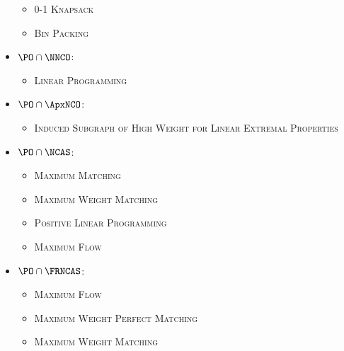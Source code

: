\documentclass{article}
\begin{document}
\begin{itemize}
\begin{itemize}
  \item \textsc{0-1 Knapsack} \cite[Theorem~2]{mayr88}
  \item \textsc{Bin Packing} \cite[Theorem~3]{mayr88}
  \end{itemize}
\item $\PO \cap \NNCO$:
  \begin{itemize}
  \item \textsc{Linear Programming}
  \end{itemize}
\item $\PO \cap \ApxNCO$:
  \begin{itemize}
  \item \textsc{Induced Subgraph of High Weight for Linear Extremal Properties} \cite{dsst97}
  \end{itemize}
\item $\PO \cap \NCAS$:
  \begin{itemize}
  \item \textsc{Maximum Matching} \cite[Theorem~5.2.1]{dsst97}
  \item \textsc{Maximum Weight Matching} \cite[Theorem~5.2.2]{dsst97}
  \item \textsc{Positive Linear Programming} \cite[Theorem~5.1.11]{dsst97} \cite{tx98}
  \item \textsc{Maximum Flow} \cite[Theorem~5.2.2]{dsst97}
  \end{itemize}
\item $\PO \cap \FRNCAS$:
  \begin{itemize}
  \item \textsc{Maximum Flow} \cite[Theorem~4.5.2]{dsst97}
  \item \textsc{Maximum Weight Perfect Matching} \cite[Theorem~4.5.2]{dsst97}
  \item \textsc{Maximum Weight Matching} \cite[Theorem~4.5.2]{dsst97}
  \end{itemize}
\end{itemize}



\end{document}
